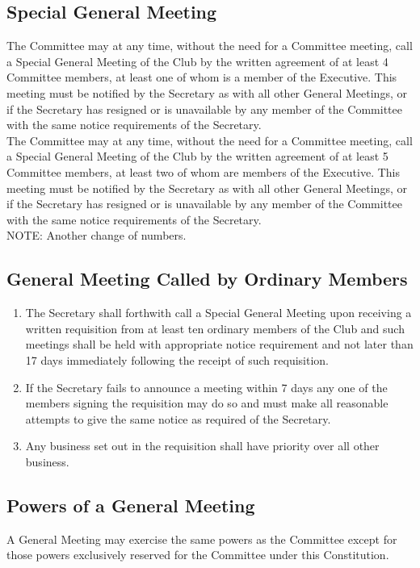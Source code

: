 \documentclass[11pt]{article} %
\begin{document}
\subsection{Special General Meeting}
{\color{red}The Committee may at any time, without the need for a Committee meeting, call a Special General Meeting of the Club by the written agreement of at least 4 Committee members, at least one of whom is a member of the Executive. This meeting must be notified by the Secretary as with all other General Meetings, or if the Secretary has resigned or is unavailable by any member of the Committee with the same notice requirements of the Secretary.}\\
{\color{ForestGreen}The Committee may at any time, without the need for a Committee meeting, call a Special General Meeting of the Club by the written agreement of at least 5 Committee members, at least two of whom are members of the Executive. This meeting must be notified by the Secretary as with all other General Meetings, or if the Secretary has resigned or is unavailable by any member of the Committee with the same notice requirements of the Secretary.}\\
{\color{Cyan}NOTE:
Another change of numbers.
}

\subsection{General Meeting Called by Ordinary Members}
\begin{enumerate}
	\item The Secretary shall forthwith call a Special General Meeting upon receiving a written requisition from at least ten ordinary members of the Club and such meetings shall be held with appropriate notice requirement and not later than 17 days immediately following the receipt of such requisition.
	\item If the Secretary fails to announce a meeting within 7 days any one of the members signing the requisition may do so and must make all reasonable attempts to give the same notice as required of the Secretary.
	\item Any business set out in the requisition shall have priority over all other business.
\end{enumerate}

\subsection{Powers of a General Meeting}
A General Meeting may exercise the same powers as the Committee except for those powers exclusively reserved for the Committee under this Constitution.
\end{document}
